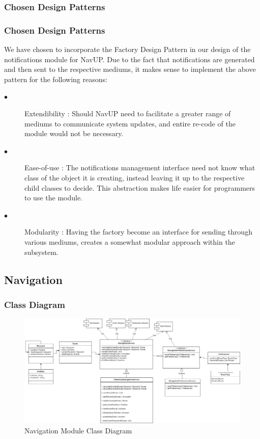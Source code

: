 \documentclass{article}
\begin{document}
        \subsubsection{Chosen Design Patterns}

        \subsubsection{Chosen Design Patterns}

        We have chosen to incorporate the Factory Design Pattern in our design of the notifications module for NavUP. Due to the fact that notifications are generated and then sent to the respective mediums, it makes sense to implement the above pattern for the following reasons:
		\begin{description}

		\item[$\bullet$]Extendibility : Should NavUP need to facilitate a greater range of mediums to communicate system updates, and entire re-code of the module would not be necessary.

		\item[$\bullet$]Ease-of-use : The notifications management interface need not know what class of the object it is creating, instead leaving it up to the respective child classes to decide. This abstraction makes life easier for programmers to use the module.

		\item[$\bullet$]Modularity : Having the factory become an interface for sending through various mediums, creates a somewhat modular approach within the subsystem.
		\end{description}
    \newpage

    \subsection{Navigation}
        \subsubsection{Class Diagram}
        \begin{figure}[H]
        	\includegraphics[width=\textwidth]{Navigation_Class_Diagram}
            \caption{Navigation Module Class Diagram}
        \end{figure}
\end{document}
